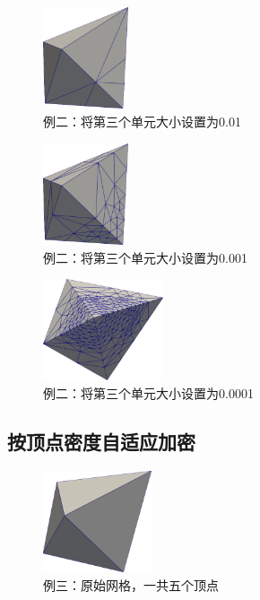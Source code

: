 \begin{figure}[!htbp]
  \centering
  \includegraphics[height=3cm]{fig/2/9.png}
  \caption{例二：将第三个单元大小设置为0.01}
  \label{fig:2-1}
\end{figure}

\begin{figure}[!htbp]
  \centering
  \includegraphics[height=3cm]{fig/2/10.png}
  \caption{例二：将第三个单元大小设置为0.001}
  \label{fig:2-1}
\end{figure}

\begin{figure}[!htbp]
  \centering
  \includegraphics[height=3cm]{fig/2/11.png}
  \caption{例二：将第三个单元大小设置为0.0001}
  \label{fig:2-1}
\end{figure}

\newpage
\subsection{按顶点密度自适应加密}

\begin{figure}[!htbp]
  \centering
  \includegraphics[height=3cm]{fig/2/12.png}
  \caption{例三：原始网格，一共五个顶点}
  \label{fig:2-1}
\end{figure}

